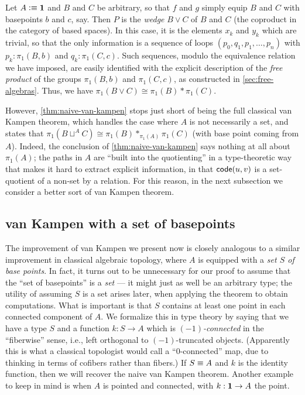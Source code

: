 \begin{eg}\label{eg:wedge}
  Let $A\vcentcolon\equiv\mathbf{1}$ and $B$ and $C$ be arbitrary, so that $f$ and $g$ simply equip $B$ and $C$ with basepoints $b$ and $c$, say.
  Then $P$ is the \emph{wedge} $B\vee C$ of $B$ and $C$ (the coproduct in the category of based spaces).
  In this case, it is the elements $x_k$ and $y_k$ which are trivial, so that the only information is a sequence of loops $(p_0,q_1,p_1,\dots,p_n)$ with $p_k:\pi_1(B,b)$ and $q_k:\pi_1(C,c)$.
  Such sequences, modulo the equivalence relation we have imposed, are easily identified with the explicit description of the \emph{free product} of the groups $\pi_1(B,b)$ and $\pi_1(C,c)$, as constructed in \autoref{sec:free-algebras}.
  Thus, we have $\pi_1(B\vee C) \cong \pi_1(B) * \pi_1(C)$.
\end{eg}

However, \autoref{thm:naive-van-kampen} stops just short of being the full classical van Kampen theorem, which handles
the case where $A$ is not necessarily a set, 
and states that $\pi_1(B\sqcup^A C) \cong \pi_1(B) *_{\pi_1(A)} \pi_1(C)$ (with base point coming from $A$).
Indeed, the conclusion of \autoref{thm:naive-van-kampen} says nothing at all about $\pi_1(A)$; the paths in $A$ are ``built into the quotienting'' in a type-theoretic way that makes it hard to extract explicit information, in that $\mathsf{code}(u,v)$ is a set-quotient of a non-set by a relation.
For this reason, in the next subsection we consider a better sort of van Kampen theorem.


\subsection{van Kampen with a set of basepoints}
\label{sec:better-vankampen}

The improvement of van Kampen we present now is closely analogous to a similar improvement in classical algebraic topology, where $A$ is equipped with a \emph{set $S$ of base points}.
In fact, it turns out to be unnecessary for our proof to assume that the ``set of basepoints'' is a \emph{set} --- it might just as well be an arbitrary type; the utility of assuming $S$ is a set arises later, when applying the theorem to obtain computations.
What is important is that $S$ contains at least one point in each connected component of $A$.
We formalize this in type theory by saying that we have a type $S$ and a function $k:S \to A$ which is \emph{$(-1)$-connected} in the ``fiberwise'' sense, i.e., left orthogonal to $(-1)$-truncated objects.
(Apparently this is what a classical topologist would call a ``$0$-connected'' map, due to thinking in terms of cofibers rather than fibers.)
If $S\equiv A$ and $k$ is the identity function, then we will recover the naive van Kampen theorem.
Another example to keep in mind is when $A$ is pointed and connected, with $k:\mathbf{1}\to A$ the point.

